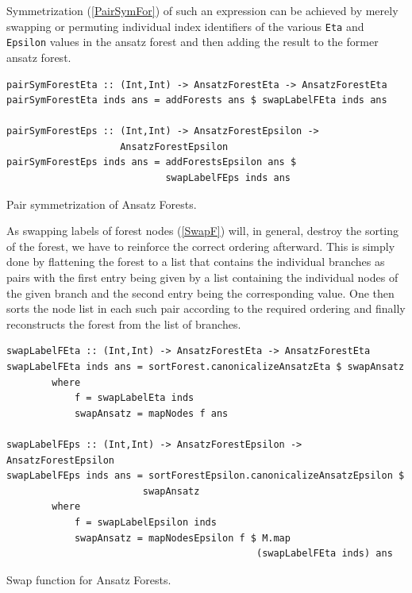 \documentclass[a4paper,12pt, DIV=14, BCOR=5mm, twoside, headsepline, numbers=noenddot]{scrbook}
\begin{document}
Symmetrization (\ref{PairSymFor}) of such an expression can be achieved by merely swapping or permuting individual index identifiers of the various \texttt{Eta} and \texttt{Epsilon} values in the ansatz forest and then adding the result to the former ansatz forest.
\begin{listing}[hbt!] 
\begin{verbatim}
pairSymForestEta :: (Int,Int) -> AnsatzForestEta -> AnsatzForestEta
pairSymForestEta inds ans = addForests ans $ swapLabelFEta inds ans

pairSymForestEps :: (Int,Int) -> AnsatzForestEpsilon ->
                    AnsatzForestEpsilon
pairSymForestEps inds ans = addForestsEpsilon ans $ 
                            swapLabelFEps inds ans
\end{verbatim} 
\caption{Pair symmetrization of Ansatz Forests.}\label{PairSymFor}
\end{listing}

As swapping labels of forest nodes (\ref{SwapF}) will, in general, destroy the sorting of the forest, we have to reinforce the correct ordering afterward. This is simply done by flattening the forest to a list that contains the individual branches as pairs with the first entry being given by a list containing the individual nodes of the given branch and the second entry being the corresponding value. One then sorts the node list in each such pair according to the required ordering and finally reconstructs the forest from the list of branches. 
\begin{listing}[hbt!] 
\begin{verbatim}
swapLabelFEta :: (Int,Int) -> AnsatzForestEta -> AnsatzForestEta
swapLabelFEta inds ans = sortForest.canonicalizeAnsatzEta $ swapAnsatz
        where
            f = swapLabelEta inds
            swapAnsatz = mapNodes f ans

swapLabelFEps :: (Int,Int) -> AnsatzForestEpsilon -> AnsatzForestEpsilon
swapLabelFEps inds ans = sortForestEpsilon.canonicalizeAnsatzEpsilon $ 
                        swapAnsatz
        where
            f = swapLabelEpsilon inds
            swapAnsatz = mapNodesEpsilon f $ M.map 
                                            (swapLabelFEta inds) ans
\end{verbatim}
\caption{Swap function for Ansatz Forests.}\label{SwapF}
\end{listing}
\end{document}
